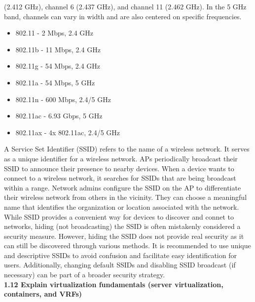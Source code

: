 \documentclass{article}
\begin{document}
(2.412 GHz), channel 6 (2.437 GHz), and channel 11 (2.462 GHz). In the 5 GHz band, channels can vary in width and are also centered on specific frequencies.

\begin{itemize}	
\item 802.11 - 2 Mbps, 2.4 GHz
\item 802.11b - 11 Mbps, 2.4 GHz
\item 802.11g - 54 Mbps, 2.4 GHz
\item 802.11a - 54 Mbps, 5 GHz
\item 802.11n - 600 Mbps, 2.4/5 GHz
\item 802.11ac - 6.93 Gbps, 5 GHz
\item 802.11ax - 4x 802.11ac, 2.4/5 GHz
\end{itemize}

	A Service Set Identifier (SSID) refers to the name of a wireless network. It serves as a unique identifier for a wireless network. APs periodically broadcast their SSID to announce their presence to nearby devices. When a device wants to connect to a wireless network, it searches for SSIDs that are being broadcast within a range. Network admins configure the SSID on the AP to differentiate their wireless network from others in the vicinity. They can choose a meaningful name that identifies the organization or location associated with the network. While SSID provides a convenient way for devices to discover and connet to networks, hiding (not broadcasting) the SSID is often mistakenly considered a security measure. However, hiding the SSID does not provide real security as it can still be discovered through various methods. It is recommended to use unique and descriptive SSIDs to avoid confusion and facilitate easy identification for users. Additionally, changing default SSIDs and disabling SSID broadcast (if necessary) can be part of a broader security strategy.\\
 
 \noindent\textbf{1.12 Explain virtualization fundamentals (server virtualization, containers, and VRFs)}\\
 
\end{document}
